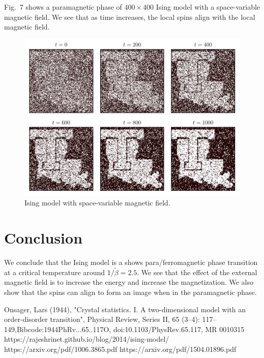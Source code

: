 \documentclass{llncs}
\begin{document}
 Fig.~7 shows a paramagnetic phase of $400\times400$ Ising model with a space-variable magnetic field. We see that as time increases, the local spins align with the local magnetic field.

\begin{figure}[h!]
	\centering
	\includegraphics[scale=0.75]{images/latech.pdf}
	\caption{Ising model with space-variable magnetic field.}
\end{figure}



\section{Conclusion}
We conclude that the Ising model is a shows para/ferromagnetic phase transition at a critical temperature around $1/\tilde\beta= 2.5$. We see that the effect of the external magnetic field is to increase the energy and increase the magnetization. We also show that the spins can align to form an image when in the paramagnetic phase. 

%
%
\begin{thebibliography}{5}
%
Onsager, Lars (1944), "Crystal statistics. I. A two-dimensional model with an order-disorder transition", Physical Review, Series II, 65 (3–4): 117–149,Bibcode:1944PhRv...65..117O, doi:10.1103/PhysRev.65.117, MR 0010315
 https://rajeshrinet.github.io/blog/2014/ising-model/
 https://arxiv.org/pdf/1006.3865.pdf
https://arxiv.org/pdf/1504.01896.pdf
\end{thebibliography}
\end{document}
